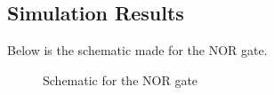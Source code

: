 \documentclass[12pt]{article}
\begin{document}
\subsection{Simulation Results}
Below is the schematic made for the NOR gate.
\begin{figure} [H]
    \centering
    \caption{Schematic for the NOR gate}
\end{figure}
\end{document}
